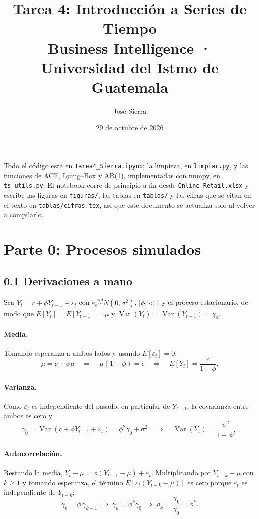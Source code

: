 \documentclass[11pt]{article}
\title{Tarea 4: Introducción a Series de Tiempo\\[2pt]\large Business Intelligence · Universidad del Istmo de Guatemala}
\author{José Sierra}
\date{29 de octubre de 2026}
\begin{document}
\maketitle

\noindent Todo el código está en \texttt{Tarea4\_Sierra.ipynb}; la limpieza, en \texttt{limpiar.py}, y las
funciones de ACF, Ljung--Box y AR(1), implementadas con numpy, en \texttt{ts\_utils.py}. El notebook corre de principio a
fin desde \texttt{Online Retail.xlsx} y escribe las figuras en \texttt{figuras/}, las tablas en \texttt{tablas/} y
las cifras que se citan en el texto en \texttt{tablas/cifras.tex}, así que este documento se actualiza solo al
volver a compilarlo.

\section{Parte 0: Procesos simulados}

\subsection*{0.1 Derivaciones a mano}

Sea $Y_t = c + \phi Y_{t-1} + \varepsilon_t$ con $\varepsilon_t \overset{iid}{\sim} N(0,\sigma^2)$, $|\phi|<1$ y el
proceso estacionario, de modo que $E[Y_t]=E[Y_{t-1}]=\mu$ y $\operatorname{Var}(Y_t)=\operatorname{Var}(Y_{t-1})=\gamma_0$.

\paragraph{Media.} Tomando esperanza a ambos lados y usando $E[\varepsilon_t]=0$:
\[
\mu = c + \phi\mu \quad\Longrightarrow\quad \mu(1-\phi)=c \quad\Longrightarrow\quad E[Y_t]=\frac{c}{1-\phi}.
\]

\paragraph{Varianza.} Como $\varepsilon_t$ es independiente del pasado, en particular de $Y_{t-1}$,
la covarianza entre ambos es cero y
\[
\gamma_0 = \operatorname{Var}(c+\phi Y_{t-1}+\varepsilon_t) = \phi^2\gamma_0 + \sigma^2
\quad\Longrightarrow\quad \operatorname{Var}(Y_t)=\frac{\sigma^2}{1-\phi^2}.
\]

\paragraph{Autocorrelación.} Restando la media, $Y_t-\mu = \phi(Y_{t-1}-\mu)+\varepsilon_t$. Multiplicando por
$Y_{t-k}-\mu$ con $k\ge 1$ y tomando esperanza, el término $E[\varepsilon_t(Y_{t-k}-\mu)]$ es cero porque
$\varepsilon_t$ es independiente de $Y_{t-k}$:
\[
\gamma_k = \phi\,\gamma_{k-1} \;\Longrightarrow\; \gamma_k = \phi^k\gamma_0 \;\Longrightarrow\; \rho_k=\frac{\gamma_k}{\gamma_0}=\phi^k.
\]
\end{document}
